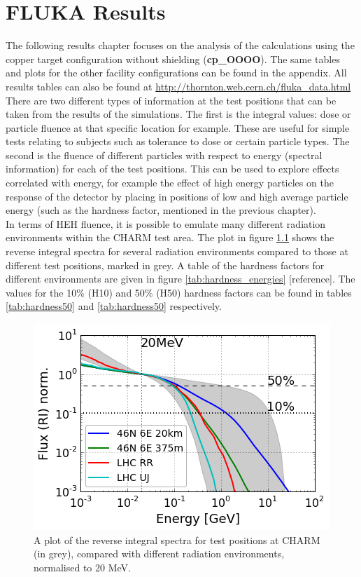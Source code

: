 \documentclass[main.tex]{subfiles}
\begin{document}
\newpage
\chapter{FLUKA Results}

The following results chapter focuses on the analysis of the calculations using the copper target configuration without shielding (\textbf{cp\_OOOO}). The same tables and plots for the other facility configurations can be found in the appendix. All results tables can also be found at \url{http://thornton.web.cern.ch/fluka_data.html}  \\

There are two different types of information at the test positions that can be taken from the results of the simulations. The first is the integral values: dose or particle fluence at that specific location for example. These are useful for simple tests relating to subjects such as tolerance to dose or certain particle types. The second is the fluence of different particles with respect to energy (spectral information) for each of the test positions. This can be used to explore effects correlated with energy, for example the effect of high energy particles on the response of the detector by placing in positions of low and high average particle energy (such as the hardness factor, mentioned in the previous chapter). \\

In terms of HEH fluence, it is possible to emulate many different radiation environments within the CHARM test area. The plot in figure \ref{fig:example_rev_spectra} shows the reverse integral spectra for several radiation environments compared to those at different test positions, marked in grey. A table of the hardness factors for different environments are given in figure \ref{tab:hardness_energies} [reference]. The values for the 10\% (H10) and 50\% (H50) hardness factors can be found in tables \ref{tab:hardness50} and \ref{tab:hardness50} respectively. \\

\begin{figure}[ht]
	\centering
	\includegraphics[scale=0.6]{./images/rev_spectra_example}
	\caption{A plot of the reverse integral spectra for test positions at CHARM (in grey), compared with different radiation environments, normalised to 20 MeV.}
	\label{fig:example_rev_spectra}
\end{figure}
\end{document}
